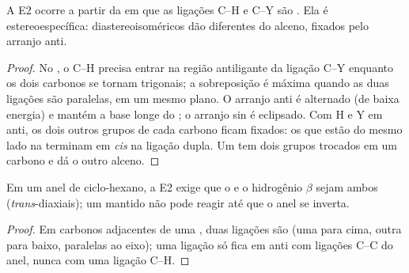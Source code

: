 \begin{proposition}\label{prop:b1:elimination:anti}
A E2 ocorre a partir da  em que as ligações C--H e C--Y são
. Ela é estereoespecífica:  diastereoisoméricos
dão  diferentes do alceno, fixados pelo arranjo anti.
\end{proposition}

\begin{proof}
No , o  C--H precisa entrar na região
antiligante da ligação C--Y enquanto os dois carbonos se tornam
trigonais; a sobreposição é máxima quando as duas ligações são
paralelas, em um mesmo plano. O arranjo anti é alternado (de baixa
energia) e mantém a base longe do ; o arranjo sin é
eclipsado. Com H e Y em anti, os dois outros grupos de cada carbono
ficam fixados: os que estão do mesmo lado na  terminam
em \textit{cis} na ligação dupla. Um  tem dois grupos
trocados em um carbono e dá o outro alceno.
\end{proof}

\begin{proposition}\label{prop:b1:elimination:cyclohexane-e2}
Em um anel de ciclo-hexano, a E2 exige que o  e o
hidrogênio $\beta$ sejam ambos  (\textit{trans}-diaxiais); um  mantido  não pode reagir até que o anel se inverta.
\end{proposition}

\begin{proof}
Em carbonos adjacentes de uma , duas ligações  são
 (uma para cima, outra para baixo, paralelas ao eixo);
uma ligação  só fica em anti com ligações C--C do anel, nunca
com uma ligação C--H.
\end{proof}

